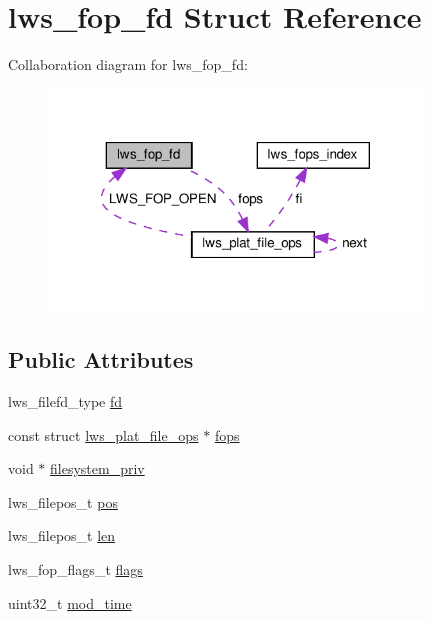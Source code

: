 \hypertarget{structlws__fop__fd}{}\section{lws\+\_\+fop\+\_\+fd Struct Reference}
\label{structlws__fop__fd}


Collaboration diagram for lws\+\_\+fop\+\_\+fd\+:
\nopagebreak
\begin{figure}[H]
\begin{center}
\leavevmode
\includegraphics[width=281pt]{structlws__fop__fd__coll__graph}
\end{center}
\end{figure}
\subsection*{Public Attributes}
\begin{DoxyCompactItemize}
\item 
lws\+\_\+filefd\+\_\+type \hyperlink{structlws__fop__fd_ab4e9b5068543cffc7dffd342d98e5c7b}{fd}
\item 
const struct \hyperlink{structlws__plat__file__ops}{lws\+\_\+plat\+\_\+file\+\_\+ops} $\ast$ \hyperlink{structlws__fop__fd_a5c16957d3ccb44ee5c9b5cb8deeee481}{fops}
\item 
void $\ast$ \hyperlink{structlws__fop__fd_ac9ca4e125bbe190173c7e2e8e61ef6e7}{filesystem\+\_\+priv}
\item 
lws\+\_\+filepos\+\_\+t \hyperlink{structlws__fop__fd_a161e1dc7bff7120ab71198fd24942703}{pos}
\item 
lws\+\_\+filepos\+\_\+t \hyperlink{structlws__fop__fd_aba3e39c1818d8a221efddddb98e884c4}{len}
\item 
lws\+\_\+fop\+\_\+flags\+\_\+t \hyperlink{structlws__fop__fd_a70784e500e0c1bdb5f4d8bcc46b97926}{flags}
\item 
uint32\+\_\+t \hyperlink{structlws__fop__fd_aa2f6af8b19612dafd51f24b855c71ba5}{mod\+\_\+time}
\end{DoxyCompactItemize}


